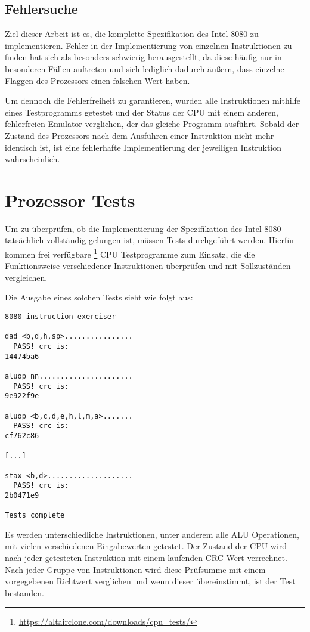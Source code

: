 \subsection{Fehlersuche}\label{sec:errors}

Ziel dieser Arbeit ist es, die komplette Spezifikation des Intel 8080 zu implementieren. Fehler in der Implementierung von einzelnen Instruktionen zu finden hat sich als besonders schwierig herausgestellt, da diese häufig nur in besonderen Fällen auftreten und sich lediglich dadurch äußern, dass einzelne Flaggen des Prozessors einen falschen Wert haben.

Um dennoch die Fehlerfreiheit zu garantieren, wurden alle Instruktionen mithilfe eines Testprogramms getestet und der Status der \ac{CPU} mit einem anderen, fehlerfreien Emulator verglichen, der das gleiche Programm ausführt.
Sobald der Zustand des Prozessors nach dem Ausführen einer Instruktion nicht mehr identisch ist, ist eine fehlerhafte Implementierung der jeweiligen Instruktion wahrscheinlich.

\section{Prozessor Tests}\label{sec:tests}

 Um zu überprüfen, ob die Implementierung der Spezifikation des Intel 8080  tatsächlich vollständig gelungen ist, müssen Tests durchgeführt werden. Hierfür kommen frei verfügbare \footnote[1]{\url{https://altairclone.com/downloads/cpu_tests/}} CPU Testprogramme zum Einsatz, die die Funktionsweise verschiedener Instruktionen überprüfen und mit Sollzuständen vergleichen.

Die Ausgabe eines solchen Tests sieht wie folgt aus:

\begin{verbatim}
8080 instruction exerciser

dad <b,d,h,sp>................
  PASS! crc is:
14474ba6

aluop nn......................
  PASS! crc is:
9e922f9e

aluop <b,c,d,e,h,l,m,a>.......
  PASS! crc is:
cf762c86

[...]

stax <b,d>....................
  PASS! crc is:
2b0471e9

Tests complete
\end{verbatim}

Es werden unterschiedliche Instruktionen, unter anderem alle \ac{ALU} Operationen, mit vielen verschiedenen Eingabewerten getestet. Der Zustand der \ac{CPU} wird nach jeder getesteten Instruktion mit einem laufenden \ac{CRC}-Wert verrechnet. Nach jeder Gruppe von Instruktionen wird diese Prüfsumme mit einem vorgegebenen Richtwert verglichen und wenn dieser übereinstimmt, ist der Test bestanden.

